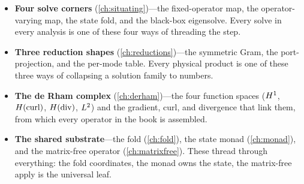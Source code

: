 \begin{itemize}[leftmargin=*]
  \item \textbf{Four solve corners} (\cref{ch:situating})---the fixed-operator map, the
  operator-varying map, the state fold, and the black-box eigensolve. Every solve in
  every analysis is one of these four ways of threading the step.
  \item \textbf{Three reduction shapes} (\cref{ch:reductions})---the symmetric Gram, the
  port-projection, and the per-mode table. Every physical product is one of these three
  ways of collapsing a solution family to numbers.
  \item \textbf{The de Rham complex} (\cref{ch:derham})---the four function spaces
  ($H^1$, $H(\mathrm{curl})$, $H(\mathrm{div})$, $L^2$) and the gradient, curl, and divergence that link
  them, from which every operator in the book is assembled.
  \item \textbf{The shared substrate}---the fold (\cref{ch:fold}), the state monad
  (\cref{ch:monad}), and the matrix-free operator (\cref{ch:matrixfree}). These thread
  through everything: the fold coordinates, the monad owns the state, the matrix-free
  apply is the universal leaf.
\end{itemize}

